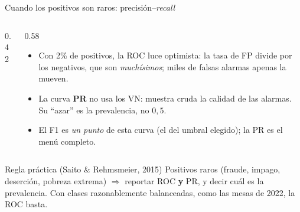 \documentclass{beamer}
\newcommand{\1}{\mathbb{I}}
\begin{document}
\begin{frame}{Cuando los positivos son raros: precisión--\emph{recall}}
\small
\begin{columns}[T]
\begin{column}{0.42\textwidth}
\begin{center}
\end{center}
\end{column}
\begin{column}{0.58\textwidth}
\vspace{0.05cm}
\begin{itemize}\itemsep4pt
  \item Con 2\% de positivos, la ROC luce optimista: la tasa de FP divide por los negativos, que son \emph{muchísimos}; miles de falsas alarmas apenas la mueven.
  \item La curva \textbf{PR} no usa los VN: muestra cruda la calidad de las alarmas. Su ``azar'' es la prevalencia, no $0{,}5$.
  \item El F1 es \emph{un punto} de esta curva (el del umbral elegido); la PR es el menú completo.
\end{itemize}
\end{column}
\end{columns}
\pause
\vspace{0.15cm}
\begin{block}{Regla práctica (Saito \& Rehmsmeier, 2015)}
Positivos raros (fraude, impago, deserción, pobreza extrema) $\Rightarrow$ reportar ROC \textbf{y} PR, y decir cuál es la prevalencia. Con clases razonablemente balanceadas, como las mesas de 2022, la ROC basta.
\end{block}
\end{frame}
\end{document}
